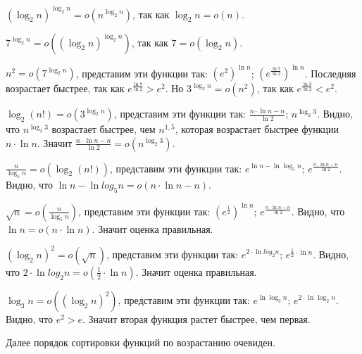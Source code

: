 \documentclass [a4paper,12pt] {report} 		%
\begin{document}
$(\log_{2}n)^{\log_{2}n} = o(n^{\log_{2}n})$, так как $\log_{2}n = o(n)$.

$7^{\log_{2}n} = o((\log_{2}n)^{\log_{2}n})$, так как $7 = o(\log_{2}n)$. 

$n^2 = o(7^{\log_{2}n})$, представим эти функции так: $(e^{2})^{\ln{n}}$; $(e^{\frac {\ln{7}}{\ln2}})^{\ln{n}}$.
Последняя возрастает быстрее, так как $e^{\frac {\ln{7}}{\ln2}} > e^2$. Но $3^{\log_{2}n} = o(n^2)$, так как $e^{\frac {\ln{3}}{\ln2}} < e^2$.

$\log_{2}(n!) = o(3^{\log_{2}n})$, представим эти функции так: $\frac {n \cdot \ln{n} - n}{\ln2}$; $n^{\log_{2}3}$. Видно, что $n^{\log_{2}3}$ возрастает быстрее, чем $n^{1,5}$, которая возрастает быстрее функции $n \cdot \ln{n}$. Значит $ \frac {n \cdot \ln{n} - n}{\ln2} = o(n^{\log_{2}3})$.

$\frac{n}{\log_{5}n} = o(\log_{2}(n!))$,  представим эти функции так: $e^{\ln{n}-\ln{\log_{5}n}}$; $e^{\frac {n \cdot \ln{n} - n}{\ln2}}$. Видно, что $\ln{n}-\ln{log_{5}n} = o(n \cdot \ln{n} - n)$.

$\sqrt{n} = o(\frac{n}{\log_{5}n})$, представим эти функции так: $(e^{\frac{1}{2}})^{\ln{n}}$; $e^{\frac {n \cdot \ln{n} - n}{\ln2}}$. Видно, что $\ln{n} = o(n \cdot \ln{n})$. Значит оценка правильная.

$(\log_{2}n)^2 = o(\sqrt{n})$, представим эти функции так: $e^{2 \cdot \ln{log_{2}n}}$; $e^{\frac{1}{2} \cdot \ln{n}}$. Видно, что $2 \cdot \ln{log_{2}n} = o({\frac{1}{2}} \cdot {\ln{n}})$. Значит оценка правильная.

$\log_{3}n = o((\log_{2}n)^2)$, представим эти функции так: $e^{\ln{\log_{3}n}}$; $e^{2 \cdot \ln{\log_{2}n}}$. Видно, что $e^2 > e$. Значит вторая функция растет быстрее, чем первая.

Далее порядок сортировки функций по возрастанию очевиден.
\end{document}
